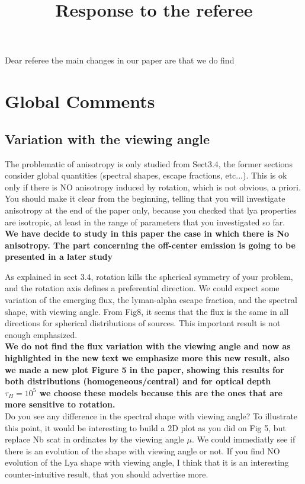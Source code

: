 \documentclass[12pt]{article}
\title{Response to the referee}
\begin{document}
\date{}
\maketitle

Dear referee the main changes in our paper are that we do find 

\section{Global Comments}

\subsection{Variation with the viewing angle}

The problematic of anisotropy is only studied from Sect3.4, the former sections consider global quantities (spectral shapes, escape fractions, etc...). This is ok only if there is NO anisotropy induced by rotation, which is not obvious, a priori. You should make it clear from the beginning, telling that you will investigate anisotropy at the end of the paper only, because you checked that lya properties are isotropic, at least in the range of parameters that you investigated so far.\\


\textbf{ We have decide to study in this paper the case in which there is No anisotropy. The part concerning the off-center emission is going to be presented in a later study\\}

As explained in sect 3.4, rotation kills the spherical symmetry of your problem, and the rotation axis defines a preferential direction. We could expect some variation of the emerging flux, the lyman-alpha escape fraction, and the spectral shape, with viewing angle. From Fig8, it seems that the flux is the same in all directions for spherical distributions of sources. This important result is not enough emphasized.\\

\textbf{We do not find the flux variation with the viewing angle and now as highlighted in the new text we emphasize more this new result, also we made a new plot Figure 5 in the paper, showing this results for both distributions (homogeneous/central) and for optical depth $\tau_{H}=10^{5}$ we choose these models because this are the ones 
that are more sensitive to rotation.}\\

Do you see any difference in the spectral shape with viewing angle? To illustrate this point, it would be interesting to build a 2D plot as you did on Fig 5, but replace Nb scat in ordinates by the viewing angle $\mu$. We could immediatly see if there is an evolution of the shape with viewing angle or not. If you find NO evolution of the Lya shape with viewing angle, I think that it is an interesting counter-intuitive result, that you should advertise more.\\
\end{document}
